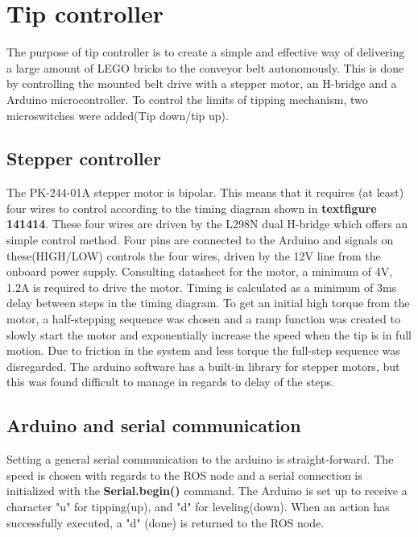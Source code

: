 \section{Tip controller} %
\label{sec:mr_tip_controller}

The purpose of tip controller is to create a simple and effective way of 
delivering a large amount of LEGO bricks to the conveyor belt autonomously. 
This is done by controlling the mounted belt drive with a stepper motor, an 
H-bridge and a Arduino microcontroller. To control the limits of tipping 
mechanism, two microswitches were added(Tip down/tip up).\\
\subsection{Stepper controller} %
\label{sub:stepper_controller}
The PK-244-01A stepper motor is bipolar. This means that it requires (at least) 
four wires to control according to the timing diagram shown in 
\textbf{textfigure 141414}. These four wires are driven by the L298N dual 
H-bridge which offers an simple control method. Four pins are connected to the 
Arduino and signals on these(HIGH/LOW) controls the four wires, driven by the 
12V line from the onboard power supply.  Consulting datasheet for the motor, a 
minimum of 
4V, 1.2A is required to drive the motor. Timing is calculated as a minimum of 
3ms delay between steps in the timing diagram. To get an initial high torque 
from the motor, a half-stepping sequence was chosen and a ramp function was 
created to slowly start the motor and exponentially increase the speed when the 
tip is in full motion. Due to friction in the system and less torque the 
full-step sequence was disregarded. The arduino software has a built-in library 
for stepper motors, but this was found difficult to manage in regards to delay 
of the steps. 

\subsection{Arduino and serial communication} %
\label{sub:arduino_and_serial_communication}
Setting a general serial communication to the arduino is straight-forward. The 
speed is chosen with regards to the ROS node and a serial connection is 
initialized with the \textbf{Serial.begin()} command. The Arduino is set up to 
receive a character "u" for tipping(up), and "d" for leveling(down). When an 
action has successfully executed, a "d" (done) is returned to the ROS node.


